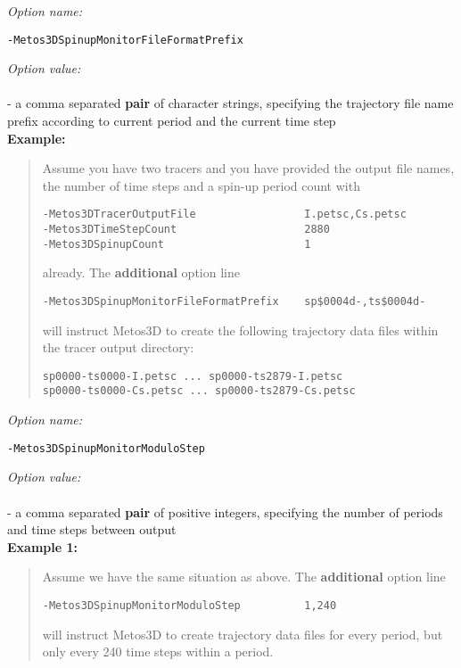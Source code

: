 \documentclass{article}
\begin{document}
\emph{Option name:}
\begin{verbatim}
-Metos3DSpinupMonitorFileFormatPrefix
\end{verbatim}

\emph{Option value:} \\
\vspace{-0.3cm}\\
- a comma separated \textbf{pair} of character strings, specifying 
the trajectory file name prefix according to current period and
the current time step \\

\textbf{Example:}
\begin{quote}
Assume you have two tracers and you have provided the output file names,
the number of time steps and a spin-up period count with
\begin{verbatim}
-Metos3DTracerOutputFile                 I.petsc,Cs.petsc
-Metos3DTimeStepCount                    2880
-Metos3DSpinupCount                      1
\end{verbatim}
already. The \textbf{additional} option line
\begin{verbatim}
-Metos3DSpinupMonitorFileFormatPrefix    sp$0004d-,ts$0004d-
\end{verbatim}
will instruct Metos3D to create the following trajectory data files
within the tracer output directory:
\begin{verbatim}
sp0000-ts0000-I.petsc ... sp0000-ts2879-I.petsc
sp0000-ts0000-Cs.petsc ... sp0000-ts2879-Cs.petsc
\end{verbatim}
\end{quote}

\emph{Option name:}
\begin{verbatim}
-Metos3DSpinupMonitorModuloStep
\end{verbatim}

\emph{Option value:} \\
\vspace{-0.3cm}\\
- a comma separated \textbf{pair} of positive integers, specifying 
the number of periods and time steps between output \\

\textbf{Example 1:}
\begin{quote}
Assume we have the same situation as above. The \textbf{additional} option line
\begin{verbatim}
-Metos3DSpinupMonitorModuloStep          1,240
\end{verbatim}
will instruct Metos3D to create trajectory data files for every
period, but only every 240 time steps within a period.
\end{quote}
\end{document}
